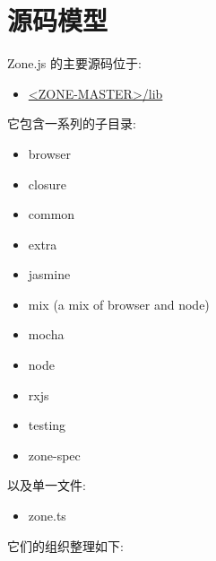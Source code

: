 \section{源码模型}


Zone.js 的主要源码位于:

\begin{itemize}
  \item \href{https://github.com/angular/zone.js/tree/master/lib/zone-spec}
        {<ZONE-MASTER>/lib}
\end{itemize}


它包含一系列的子目录:

\begin{itemize}
  \item browser
  \item closure
  \item common
  \item extra
  \item jasmine
  \item mix (a mix of browser and node)
  \item mocha
  \item node
  \item rxjs
  \item testing
  \item zone-spec
\end{itemize}


以及单一文件:

\begin{itemize}
  \item zone.ts
\end{itemize}


它们的组织整理如下:


